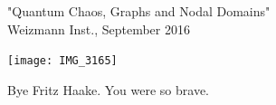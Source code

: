 \begin{frame} {"Quantum Chaos, Graphs and Nodal Domains"\\
                Weizmann Inst., September 2016}
\begin{center}
\hfill\texttt{[image: IMG\_3165]}
\end{center}

Bye Fritz Haake. You were so brave.
\end{frame} %



